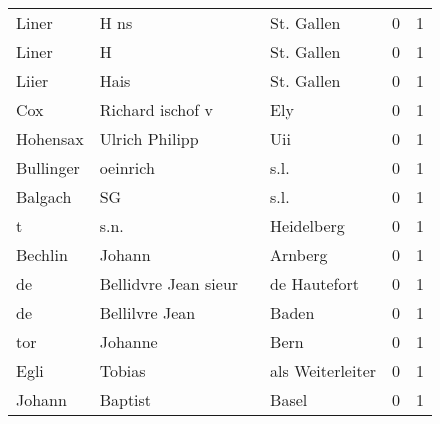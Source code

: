 \begin{tabular}{llllrr}
                    Liner &                               H ns &             &                                  St. Gallen &          0 &         1 \\
                    Liner &                                  H &             &                                  St. Gallen &          0 &         1 \\
                    Liier &                               Hais &             &                                  St. Gallen &          0 &         1 \\
                      Cox &                   Richard ischof v &             &                                         Ely &          0 &         1 \\
                 Hohensax &                     Ulrich Philipp &             &                                         Uii &          0 &         1 \\
                Bullinger &                           oeinrich &             &                                        s.l. &          0 &         1 \\
                  Balgach &                                 SG &             &                                        s.l. &          0 &         1 \\
                        t &                               s.n. &             &                                  Heidelberg &          0 &         1 \\
                  Bechlin &                             Johann &             &                                     Arnberg &          0 &         1 \\
                       de &               Bellidvre Jean sieur &             &                                de Hautefort &          0 &         1 \\
                       de &                     Bellilvre Jean &             &                                       Baden &          0 &         1 \\
                      tor &                            Johanne &             &                                        Bern &          0 &         1 \\
                     Egli &                             Tobias &             &                            als Weiterleiter &          0 &         1 \\
                   Johann &                            Baptist &             &                                       Basel &          0 &         1 \\

\end{tabular}
